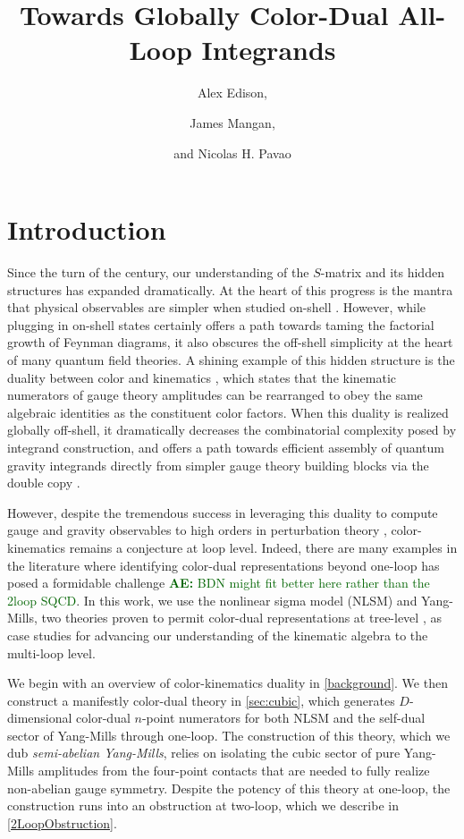 \documentclass[11pt,letter]{article}
\author{\large Alex Edison,}
\author{\large James Mangan,}
\author{\large and Nicolas H. Pavao}
\affiliation{Department of Physics and Astronomy, Northwestern
  University, Evanston, Illinois 60208, USA}
\title{\center  \fontsize{18.8}{20} \selectfont  Towards Globally Color-Dual All-Loop Integrands}
\newcommand{\ace}[1]{\textcolor{darkgreen}{\textbf{AE:}{ #1}}}
\begin{document}
\maketitle
\flushbottom
 

\section{Introduction}\label{intro}
Since the turn of the century, our understanding of the $S$-matrix and
its hidden structures has expanded dramatically. At the heart of this
progress is the mantra that physical observables are simpler when
studied on-shell
\cite{Parke:1986gb,TasiLance,Cheung:2017pzi}. However, while plugging
in on-shell states certainly offers a path towards taming the
factorial growth of Feynman diagrams, it also obscures the off-shell
simplicity at the heart of many quantum field theories. A shining
example of this hidden structure is the duality between color and
kinematics \cite{BCJ,Bern:2010ue,BCJreview}, which states that the
kinematic numerators of gauge theory amplitudes can be rearranged to
obey the same algebraic identities as the constituent color
factors. When this duality is realized globally off-shell, it
dramatically decreases the combinatorial complexity posed by integrand
construction, and offers a path towards efficient assembly of quantum
gravity integrands directly from simpler gauge theory building blocks
via the double copy \cite{BCJ,Bern:2010ue}.

However, despite the tremendous success in leveraging this duality to
compute gauge and gravity observables to high orders in perturbation
theory \cite{FiveLoopN4, GeneralizedDoubleCopyFiveLoops, Bern:2018jmv,
  Carrasco:2021otn}, color-kinematics remains a conjecture at loop
level. Indeed, there are many examples in the literature where
identifying color-dual representations beyond one-loop has posed a
formidable challenge
\cite{Mogull:2015adi,Johansson:2017bfl,KalinN2TwoLoop} \ace{BDN might
  fit better here rather than the 2loop SQCD}. In this work, we use
the nonlinear sigma model (NLSM) and Yang-Mills, two theories proven
to permit color-dual representations at tree-level
\cite{Feng:2010my,Cachazo:2014xea}, as case studies for advancing our
understanding of the kinematic algebra to the multi-loop level.

We begin with an overview of color-kinematics duality in
\cref{background}. We then construct a manifestly color-dual theory in
\cref{sec:cubic}, which generates $D$-dimensional color-dual $n$-point
numerators for both NLSM and the self-dual sector of Yang-Mills
through one-loop. The construction of this theory, which we dub
\textit{semi-abelian Yang-Mills}, relies on isolating the cubic sector
of pure Yang-Mills amplitudes from the four-point contacts that are
needed to fully realize non-abelian gauge symmetry. Despite the
potency of this theory at one-loop, the construction runs into an
obstruction at two-loop, which we describe in \cref{2LoopObstruction}.
\end{document}

